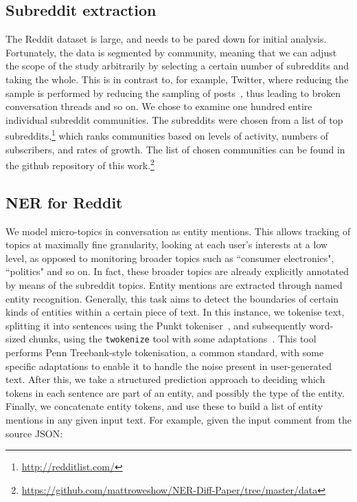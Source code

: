 \documentclass[review]{elsarticle}
\begin{document}
\subsection{Subreddit extraction}

The Reddit dataset is large, and needs to be pared down for initial analysis.
Fortunately, the data is segmented by community, meaning that we can adjust the scope of the study arbitrarily by selecting a certain number of subreddits and taking the whole.
This is in contrast to, for example, Twitter, where reducing the sample is performed by reducing the sampling of posts~\cite{kergl2014endogenesis}, thus leading to broken conversation threads and so on.
We chose to examine one hundred entire individual subreddit communities.
The subreddits were chosen from a list of top subreddits,\footnote{\url{http://redditlist.com/}} which ranks communities based on levels of activity, numbers of subscribers, and rates of growth.
The list of chosen communities can be found in the github repository of this work.\footnote{\url{https://github.com/mattroweshow/NER-Diff-Paper/tree/master/data}}


\subsection{NER for Reddit}


We model micro-topics in conversation as entity mentions.
This allows tracking of topics at maximally fine granularity, looking at each user's interests at a low level, as opposed to monitoring broader topics such as ``consumer electronics", ``politics" and so on.
In fact, these broader topics are already explicitly annotated by means of the subreddit topics.
Entity mentions are extracted through named entity recognition.
Generally, this task aims to detect the boundaries of certain kinds of entities within a certain piece of text.
In this instance, we tokenise text, splitting it into sentences using the Punkt tokeniser~\cite{kiss2006unsupervised}, and subsequently word-sized chunks, using the {\tt twokenize} tool with some adaptations~\cite{o2010tweetmotif}.
This tool performs Penn Treebank-style tokenisation, a common standard, with some specific adaptations to enable it to handle the noise present in user-generated text.
After this, we take a structured prediction approach to deciding which tokens in each sentence are part of an entity, and possibly the type of the entity.
Finally, we concatenate entity tokens, and use these to build a list of entity mentions in any given input text.
For example, given the input comment from the source JSON:
\end{document}
